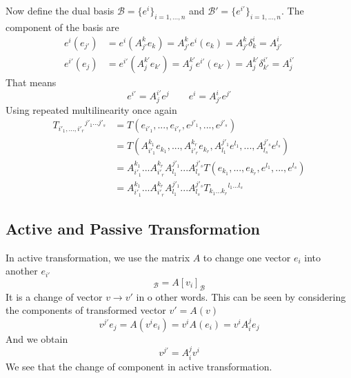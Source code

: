 \documentclass[../../../main.tex]{subfiles}
\begin{document}
Now define the dual basis $\mathcal{B}=\{e^i\}_{i=1,\dots,n}$ and $\mathcal{B}'=\{e^{i'}\}_{i=1,\dots,n}$.
The component of the basis are
\begin{align*}
  e^{i}(e_{j'}) & =  e^{i}\left( A^{k}_{j'}e_{k} \right)  = A^{k}_{j'} e^{i}\left( e_{k} \right) = A^{k}_{j'} \delta^{i}_{k} = A^{i}_{j'}       \\
  e^{i'}(e_{j}) & =  e^{i'}\left( A^{k'}_{j}e_{k'} \right)  = A^{k'}_{j} e^{i'}\left( e_{k'} \right) = A^{k'}_{j} \delta^{i'}_{k'} = A^{i'}_{j}
\end{align*}
That means
\begin{equation*}
  e^{i'} = A^{i'}_{j} e^{j} \qquad
  e^{i} = A^{i}_{j'} e^{j'}
\end{equation*}
Using repeated multilinearity once again
\begin{align*}
  T_{i'_{1},...,i'_{r}}{}^{j'_{1}...j'_{s}} & =  T(e_{i'_{1}}, ..., e_{i'_{r}}, e^{j'_{1}}, ..., e^{j'_{s}})                                                                             \\
                                            & =  T(A_{i'_{1}}^{k_{1}}e_{k_{1}}, ..., A_{i'_{r}}^{k_{r}}e_{k_{r}}, A_{l_{1}}^{j'_{1}}e^{l_{1}}, ..., A_{l_{s}}^{j'_{s}}e^{l_{s}})         \\
                                            & =  A_{i'_{1}}^{k_{1}}...A_{i'_{r}}^{k_{r}} A_{l_{1}}^{j'_{1}}...A_{l_{s}}^{j'_{s}} T(e_{k_{1}}, ..., e_{k_{r}}, e^{l_{1}}, ..., e^{l_{s}}) \\
                                            & =  A_{i'_{1}}^{k_{1}}...A_{i'_{r}}^{k_{r}} A_{l_{1}}^{j'_{1}}...A_{l_{s}}^{j'_{s}} T_{k_{1}...k_{r}}{}^{l_{1}...l_{s}}
\end{align*}

\subsection{Active and Passive Transformation}
In active transformation, we use the matrix $A$ to change one vector $e_{i}$ into another $e_{i'}$
\begin{equation*}
  [v_{i'}]_{\mathcal{B}} = A[v_{i}]_{\mathcal{B}}
\end{equation*}
It is a change of vector $v \to v'$ in o other words.
This can be seen by considering the components of transformed vector $v'=A(v)$
\begin{equation*}
  v^{j'} e_{j} = A(v^{i} e_{i}) = v^{i} A(e_{i}) = v^{i} A_{i}^{j} e_{j}
\end{equation*}
And we obtain
\begin{equation*}
  v^{j'} = A_{i}^{j} v^{i}
\end{equation*}
We see that the change of component in active transformation.
\end{document}
